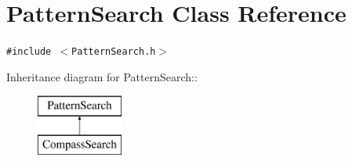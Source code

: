 \section{Pattern\-Search Class Reference}
\label{classPatternSearch}
{\tt \#include $<$Pattern\-Search.h$>$}

Inheritance diagram for Pattern\-Search::\begin{figure}[H]
\begin{center}
\leavevmode
\includegraphics[height=2cm]{classPatternSearch}
\end{center}
\end{figure}
